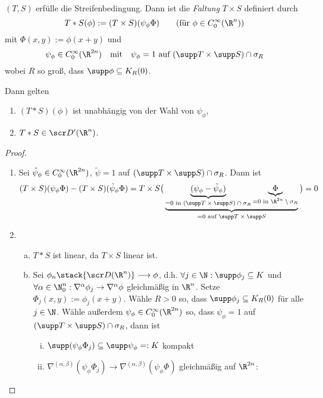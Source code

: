 \begin{st} \label{5.38}
	$(T,S)$ erfülle die Streifenbedingung.
	Dann ist die \emph{Faltung} $T \times S$ definiert durch
	\[
		T \ast S(\phi)
		:= (T \times S)(\psi_\phi \Phi)
		\qquad \text{(für $\phi \in C_0^\infty(\R^n)$)}
	\]
	mit $\Phi(x,y) := \phi(x+y)$ und
	\[
		\psi_\phi \in C_0^\infty(\R^{2n})
		\quad \text{mit} \quad
		\psi_\phi = 1 \text{ auf $(\supp T \times \supp S) \cap \sigma_R$}
	\]
	wobei $R$ so groß, dass $\supp \phi \subset K_R(0)$.

	Dann gelten
	\begin{enumerate}[1)]
		\item
			$(T \ast S)(\phi)$ ist unabhängig von der Wahl von $\psi_\phi$,
		\item
			$T \ast S \in \scr D'(\R^n)$.
	\end{enumerate}
	\begin{proof}
		\begin{enumerate}[1)]
			\item
				Sei $\tilde \psi_\phi \in C_0^\infty(\R^{2n})$, $\tilde \psi = 1$ auf $(\supp T \times \supp S) \cap \sigma_R$.
				Dann ist
				\begin{align*}
					(T\times S)(\psi_\phi \Phi) - (T\times S)(\tilde \psi_\phi \Phi)
					= T \times S \big( \underbrace{\underbrace{(\psi_\phi - \tilde \psi_\phi)}_{= 0 \text{ in $(\supp T \times \supp S) \cap \sigma_R$}} \underbrace{\Phi}_{= 0 \text{ in $\R^{2n} \setminus \sigma_R$}}}_{= 0 \text{ auf $\supp T \times \supp S$}} \big)
					= 0
				\end{align*}
			\item
				\begin{enumerate}[a)]
					\item
						$T \ast S$ ist linear, da $T \times S$ linear ist.
					\item
						Sei $\phi_n \stack{\scr D(\R^n)}\longrightarrow \phi$, d.h. $\forall j \in \N: \supp \phi_j \subset K$ und $\forall \alpha \in \N_0^n : \nabla^\alpha \phi_j \to \nabla^\alpha \phi$ gleichmäßig in $\R^n$.
						Setze $\Phi_j(x,y) := \phi_j(x+y)$.
						Wähle $R > 0$ so, dass $\supp \phi_j \subset K_R(0)$ für alle $j \in \N$.
						Wähle außerdem $\psi_\phi \in C_0^\infty(\R^{2n})$ so, dass $\psi_\phi = 1$ auf $(\supp T \times \supp S) \cap \sigma_R$, dann ist
						\begin{enumerate}[(i)]
							\item
								$\supp (\psi_\phi \Phi_j) \subset \supp \psi_\phi =: K$ kompakt
							\item
								$\nabla^{(\alpha,\beta)} (\psi_\phi \Phi_j) \to \nabla^{(\alpha, \beta)} (\psi_\phi \Phi)$ gleichmäßig auf $\R^{2n}$:


\end{enumerate}
\end{enumerate}
\end{enumerate}
\end{proof}
\end{st}
